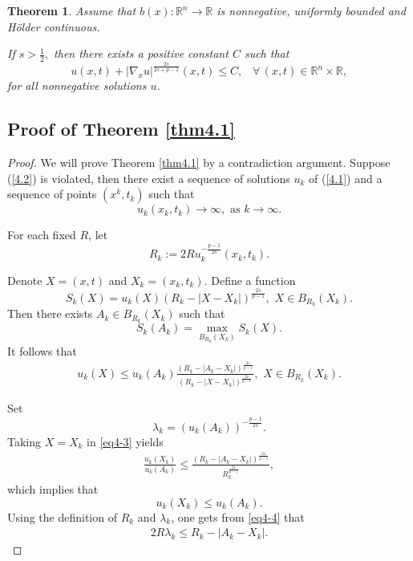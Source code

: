\documentclass[12pt]{article}
\newtheorem{theorem}{Theorem}[section]
\theoremstyle{remark}
\numberwithin{equation}{section}
\begin{document}
\begin{theorem} \label{thm4.2} Assume that
  $b(x):  \mathbb{R}^n \to \mathbb{R}$  is nonnegative, uniformly bounded and  H\"{o}lder continuous.

If $s>\frac{1}{2},$ then there exists a positive constant $C$ such that
$$
u(x,t)+|\nabla_x u|^{\frac{2s}{2s+p-1}}(x,t)\leq C,  \;\;\; \forall \, (x,t) \in \mathbb{R}^n \times \mathbb{R},
$$
for all nonnegative solutions $u$.
\end{theorem}

\subsection{Proof of Theorem \ref{thm4.1}}

\begin{proof}

We will prove Theorem \ref{thm4.1} by a contradiction argument. Suppose (\ref{4.2}) is violated, then there exist a sequence of solutions $u_k$ of (\ref{4.1}) and a sequence of points  $(x^k, t_k)$ such that
$$u_k(x_k, t_k) \to \infty, \mbox{ as } k \to \infty. $$



For each fixed $R$, let
$$
R_k:=2 R u_k^{-\frac{p-1}{2s}}(x_k, t_k).
$$

Denote $X =(x,t)$ and $X_k = (x_k, t_k)$.
Define a function
$$
S_k(X)=u_k(X)(R_k-|X-X_k|)^{\frac{2s}{p-1}},\,\, X \in B_{R_k}(X_k).
$$
Then there exists $A_k \in B_{R_k}(X_k)$ such that
$$
S_k(A_k)=\mathop{\max}\limits_{B_{R_k}(X_k)} S_k(X).
$$
It follows that
\begin{eqnarray}\label{eq4-3}
u_k(X)\leq u_k(A_k)\frac{(R_k-|A_k-X_k|)^{\frac{2s}{p-1}}}{(R_k-|X-X_k|)^{\frac{2s}{p-1}}},\,\, X \in B_{R_k}(X_k).
\end{eqnarray}

Set
$$
\lambda_k=(u_k(A_k))^{-\frac{p-1}{2s}}.
$$
Taking $X=X_k$ in \eqref{eq4-3} yields
 \begin{eqnarray}\label{eq4-4}
\frac{u_k(X_k)}{u_k(A_k)}\leq \frac{(R_k-|A_k-X_k|)^\frac{2s}{p-1}}{R_k^{\frac{2s}{p-1}}},
\end{eqnarray}
which implies  that
$$
u_k(X_k)\leq u_k(A_k).
$$
Using the definition of $R_k$ and $\lambda_k$, one gets from \eqref{eq4-4} that
 \begin{eqnarray}\label{eq4-5}
2R \lambda_k\leq R_k-|A_k-X_k|.
\end{eqnarray}


\end{proof}
\end{document}

